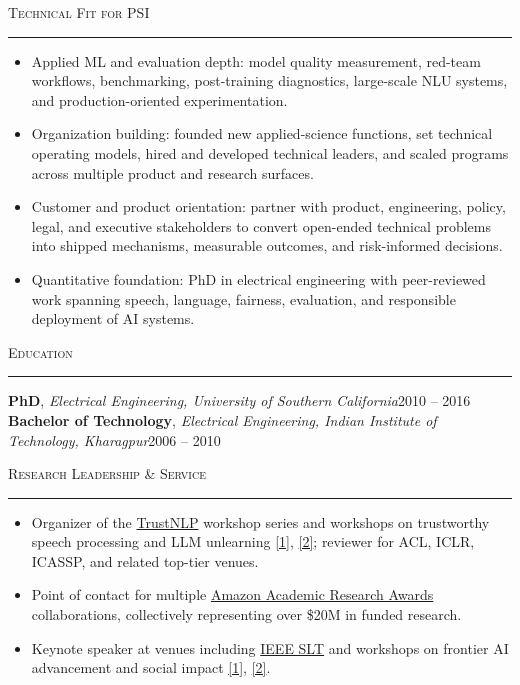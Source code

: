 \documentclass[11pt]{article}
\newcommand{\sectionheading}[1]{%
  \vspace{8pt}%
  {\large\scshape #1}\par\vspace{1pt}\hrule\vspace{3pt}%
}
\begin{document}
\sectionheading{Technical Fit for PSI}
\begin{itemize}
  \item Applied ML and evaluation depth: model quality measurement, red-team workflows, benchmarking, post-training diagnostics, large-scale NLU systems, and production-oriented experimentation.
  \item Organization building: founded new applied-science functions, set technical operating models, hired and developed technical leaders, and scaled programs across multiple product and research surfaces.
  \item Customer and product orientation: partner with product, engineering, policy, legal, and executive stakeholders to convert open-ended technical problems into shipped mechanisms, measurable outcomes, and risk-informed decisions.
  \item Quantitative foundation: PhD in electrical engineering with peer-reviewed work spanning speech, language, fairness, evaluation, and responsible deployment of AI systems.
\end{itemize}

\sectionheading{Education}
\textbf{PhD}, \textit{Electrical Engineering, University of Southern California}\hfill 2010 -- 2016\\
\textbf{Bachelor of Technology}, \textit{Electrical Engineering, Indian Institute of Technology, Kharagpur}\hfill 2006 -- 2010

\sectionheading{Research Leadership \& Service}
\begin{itemize}
  \item Organizer of the \href{https://trustnlpworkshop.github.io/}{TrustNLP} workshop series and workshops on trustworthy speech processing and LLM unlearning \href{https://trustworthyspeechprocessing.github.io/}{[1]}, \href{https://llmunlearningsemeval2025.github.io/}{[2]}; reviewer for ACL, ICLR, ICASSP, and related top-tier venues.
  \item Point of contact for multiple \href{https://www.amazon.science/research-awards}{Amazon Academic Research Awards} collaborations, collectively representing over \$20M in funded research.
  \item Keynote speaker at venues including \href{https://signalprocessingsociety.org/newsletter/2026/06/bridging-research-and-innovation-ieee-spoken-language-technology-slt-workshop}{IEEE SLT} and workshops on frontier AI advancement and social impact \href{https://advml-frontier.github.io/}{[1]}, \href{https://nlp4social.github.io/NSG-2026/}{[2]}.
\end{itemize}
\end{document}
